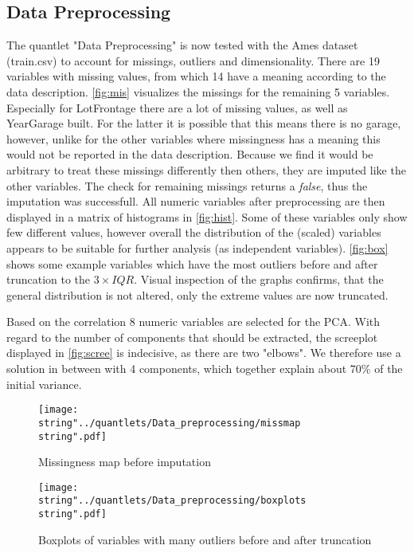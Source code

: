 
\subsection{Data Preprocessing}
The quantlet "Data Preprocessing" is now tested with the Ames dataset (train.csv) to account for missings, outliers and dimensionality. 
There are 19 variables with missing values, from which 14 have a meaning according to the data description. 
\autoref{fig:mis} visualizes the missings for the remaining 5 variables. Especially for LotFrontage there are a lot of missing values, as well as YearGarage built. For the latter it is possible that this means there is no garage, however, unlike for the other variables where missingness has a meaning this would not be reported in the data description. Because we find it would be arbitrary to treat these missings differently then others, they are imputed like the other variables.
The check for remaining missings returns a \textit{false}, thus the imputation was successfull. 
All numeric variables after preprocessing are then displayed in a matrix of  histograms in \autoref{fig:hist}. Some of these variables only show few different values, however overall the distribution of the (scaled) variables appears to be suitable for further analysis (as independent variables). 
\autoref{fig:box} shows some example variables which have the most outliers before and after truncation to the $3 \times IQR$. Visual inspection of the graphs confirms, that the general distribution is not altered, only the extreme values are now truncated. 


Based on the correlation 8 numeric variables are selected for the PCA. With regard to the number of components that should be extracted, the screeplot displayed in \autoref{fig:scree} is indecisive, as there are two "elbows".  We therefore use a solution in between with 4 components, which together explain about 70\% of the initial variance. 



\begin{figure}[H]
  \centering
\texttt{[image: \\string"../quantlets/Data\_preprocessing/missmap\\string".pdf]}
  \caption{Missingness map before imputation}\label{fig:mis}
\end{figure}
 
\begin{figure}[H]
  \centering
\texttt{[image: \\string"../quantlets/Data\_preprocessing/boxplots\\string".pdf]}
  \caption{Boxplots of variables with many outliers before and after truncation}\label{fig:box}
\end{figure}

